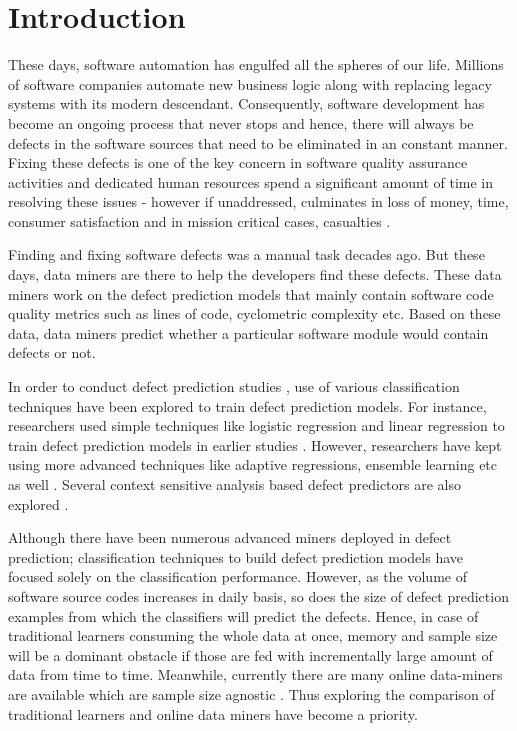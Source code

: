 \documentclass[sigplan]{acmart}\settopmatter{printfolios=true,printccs=false,printacmref=false}
\begin{document}
\section{Introduction}
These days, software automation has engulfed all the spheres of our life. Millions of software companies automate new business logic along with replacing legacy systems with its modern descendant. Consequently, software development has become an ongoing process that never stops and hence, there will always be defects in the software sources that need to be eliminated in an constant manner. Fixing these defects is one of the key concern in software quality assurance activities and dedicated human resources spend a significant amount of time in resolving these issues - however if unaddressed, culminates in loss of money, time, consumer satisfaction and in mission critical cases, casualties \cite{erlikh2000leveraging}.  

Finding and fixing software defects was a manual task decades ago. But these days, data miners are there to help the developers find these defects. These data miners work on the defect prediction models that mainly contain software code quality metrics such as lines of code, cyclometric complexity etc. Based on these data, data miners predict whether a particular software module would contain defects or not.  

In order to conduct defect prediction studies \cite{hall2012systematic, shihab2012exploration}, use of various classification techniques have been explored to train defect prediction models. For instance, researchers used simple techniques like logistic regression and linear regression to train defect prediction models in earlier studies \cite{basili1996validation, hassan2009predicting}. However, researchers have kept using more advanced techniques like adaptive regressions, ensemble learning etc as well \cite{bettenburg2012think, dietterich2000experimental}. Several context sensitive analysis based defect predictors are also explored \cite{menzies2011local}.  

Although there have been numerous advanced miners deployed in defect prediction; classification techniques to build defect prediction models have focused solely on the classification performance. However, as the volume of software source codes increases in daily basis, so does the size of defect prediction examples from which the classifiers will predict the defects. Hence, in case of traditional learners consuming the whole data at once, memory and sample size will be a dominant obstacle if those are fed with incrementally large amount of data from time to time. Meanwhile, currently there are many online data-miners are available which are sample size agnostic \cite{canzian2015real, de2013samoa}. Thus exploring the comparison of traditional learners and online data miners have become a priority.  
\end{document}
